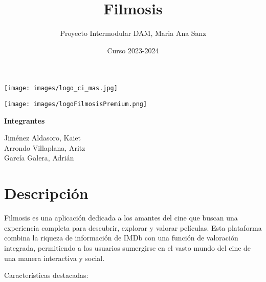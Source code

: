\documentclass{article}
\title{Filmosis}
\author{Proyecto Intermodular DAM, Maria Ana Sanz}
\date{Curso 2023-2024}
\begin{document}
\begin{titlepage}
    \centering

    \maketitle

    \texttt{[image: images/logo\_ci\_mas.jpg]}

    \vspace{1cm}
    
    \texttt{[image: images/logoFilmosisPremium.png]}
    
    \vspace{1cm}
    
    \textbf{Integrantes}
    
    \vspace{0.5cm}
    
    \begin{minipage}{0.5\textwidth}
        \centering
        Jiménez Aldasoro, Kaiet \\
        Arrondo Villaplana, Aritz \\
        García Galera, Adrián
    \end{minipage}
    
\end{titlepage}

\renewcommand{\contentsname}{Índice}
\tableofcontents

\newpage

\section{Descripción}

Filmosis es una aplicación dedicada a los amantes del cine que buscan una experiencia completa para descubrir, explorar y valorar películas. Esta plataforma combina la riqueza de información de IMDb con una función de valoración integrada, permitiendo a los usuarios sumergirse en el vasto mundo del cine de una manera interactiva y social.

Características destacadas:
\end{document}
